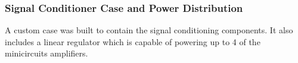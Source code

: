     \subsubsection{Signal Conditioner Case and Power Distribution}

A custom case was built to contain the signal conditioning components.  It also includes a linear regulator which is capable of powering up to 4 of the minicircuits amplifiers.

